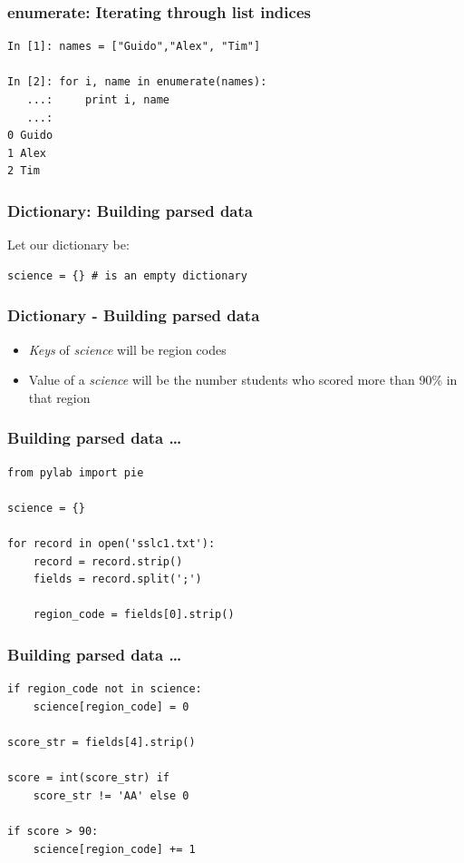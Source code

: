 \documentclass[14pt,compress]{beamer}
\begin{document}
\begin{frame}[fragile]
  \frametitle{enumerate: Iterating through list indices}
\begin{lstlisting}
In [1]: names = ["Guido","Alex", "Tim"]

In [2]: for i, name in enumerate(names):
   ...:     print i, name
   ...: 
0 Guido
1 Alex
2 Tim
\end{lstlisting}
\end{frame}

\begin{frame}[fragile]
  \frametitle{Dictionary: Building parsed data}
    Let our dictionary be:
    \begin{lstlisting}
science = {} # is an empty dictionary
    \end{lstlisting}
\end{frame}

\begin{frame}[fragile]
  \frametitle{Dictionary - Building parsed data}
  \begin{itemize}
    \item \emph{Keys} of \emph{science} will be region codes
    \item Value of a \emph{science} will be the number students who scored more than 90\% in that region
  \end{itemize}
\end{frame}

\begin{frame}[fragile]
  \frametitle{Building parsed data \ldots}
  \begin{lstlisting}
from pylab import pie

science = {}

for record in open('sslc1.txt'):
    record = record.strip()
    fields = record.split(';')

    region_code = fields[0].strip()
  \end{lstlisting}
\end{frame}

\begin{frame}[fragile]
  \frametitle{Building parsed data \ldots}
  \begin{lstlisting}
if region_code not in science:
    science[region_code] = 0

score_str = fields[4].strip()

score = int(score_str) if
    score_str != 'AA' else 0

if score > 90:
    science[region_code] += 1
  \end{lstlisting}
\end{frame}
\end{document}
